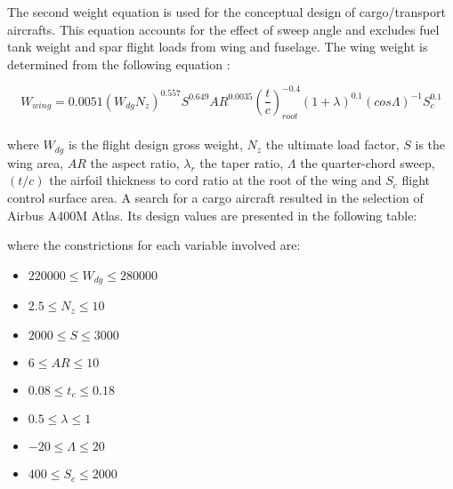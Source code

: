 The second weight equation is used for the conceptual 
design of cargo/transport aircrafts. This equation 
accounts for the effect of sweep angle and 
excludes fuel tank weight and spar flight loads from wing 
and fuselage. The wing weight is determined from the 
following equation \cite{wing_weight}:

\begin{equation} \label{aircraft2}
W_{wing} = 0.0051 (W_{dg}N_{z})^{0.557} S^{0.649} 
AR^{0.0035} \left( \dfrac{t}{c} \right)_{root}^{-0.4} 
(1 + λ)^{0.1} (cosΛ)^{-1} S_{c}^{0.1}
\end{equation}
\\
where $W_{dg}$ is the flight design gross weight, $N_{z}$ 
the ultimate load factor, $S$ is the wing area, $AR$ the 
aspect ratio, $λ_{r}$ the taper ratio, $Λ$ the 
quarter-chord sweep, $(t/c)$ the airfoil thickness to cord 
ratio at the root of the wing and $S_{c}$ flight control 
surface area. A search for a cargo aircraft resulted in 
the selection of Airbus A400M Atlas. Its design values
are presented in the following table: 

\begin{table}[h!]
\centering
{}
\caption{Airbus A400M Atlas design values}
\end{table} 

where the constrictions for each variable involved are:
\begin{itemize}
\itemsep0em
\item $220000 \leq W_{dg} \leq 280000$
\item $ 2.5 \leq N_{z} \leq 10 $ 
\item $2000 \leq S \leq 3000$
\item $6 \leq AR \leq 10$
\item $ 0.08 \leq t_{c} \leq 0.18$
\item $0.5 \leq \lambda \leq 1$
\item $ -20 \leq \Lambda \leq 20$
\item $400 \leq S_{c} \leq 2000$


\end{itemize} 


